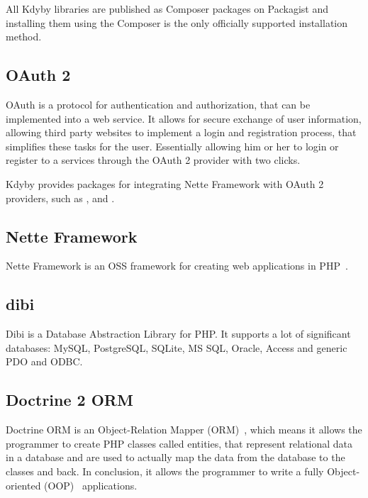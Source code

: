 All Kdyby libraries are published as Composer packages on Packagist and installing them using the Composer is the only officially supported installation method.

\subsection{OAuth 2} \label{sec:theory:oauth2}

OAuth is a protocol for authentication and authorization, that can be implemented into a web service. It allows for secure exchange of user information, allowing third party websites to implement a login and registration process, that simplifies these tasks for the user. Essentially allowing him or her to login or register to a services through the OAuth 2 provider with two clicks.

Kdyby provides packages for integrating Nette Framework with OAuth 2 providers, such as ,  and .

\subsection{Nette Framework} \label{sec:theory:nette}

Nette Framework is an OSS framework for creating web applications in PHP~\cite{wiki:nette}.

\subsection{dibi} \label{sec:theory:dibi}

Dibi is a Database Abstraction Library for PHP. It supports a lot of significant databases: MySQL, PostgreSQL, SQLite, MS SQL, Oracle, Access and generic PDO and ODBC.~\cite{dibi:homepage}

\subsection{Doctrine 2 ORM} \label{sec:theory:doctrine}

Doctrine ORM is an Object-Relation Mapper (ORM)~\cite{wiki:orm}, which means it allows the programmer to create PHP classes called entities, that represent relational data in a database and are used to actually map the data from the database to the classes and back. In conclusion, it allows the programmer to write a fully Object-oriented (OOP)~\cite{wiki:oop} applications.

